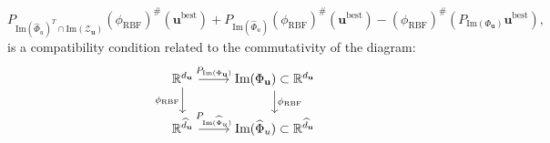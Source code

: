 \begin{rmk}
  \begin{equation*}
    P_{\text{Im}(\widehat{\Phi}_{u})^T\cap\text{Im}(\mathcal{Z}_{\mathbf u})}(\phi_{\text{RBF}})^{\#}({\mathbf u}^{\text{best}})+P_{\text{Im}(\widehat{\Phi}_{u})}(\phi_{\text{RBF}})^{\#}({\mathbf u}^{\text{best}})-(\phi_{\text{RBF}})^{\#}(P_{\text{Im}(\Phi_{\mathbf u})}{\mathbf u}^{\text{best}}),
  \end{equation*}
  is a compatibility condition related to the commutativity of the diagram:
  \[ \begin{tikzcd}
    \mathbb{R}^{d_{\mathbf u}} \arrow{r}{P_{\text{Im}(\Phi_{\mathbf u})}} \arrow[swap]{d}{\phi_{\text{RBF}}} & \text{Im}(\Phi_{\mathbf u})\subset\mathbb{R}^{d_{\mathbf u}} \arrow{d}{\phi_{\text{RBF}}} \\%
    \mathbb{R}^{\widehat{d}_{\mathbf u}} \arrow{r}{P_{\text{Im}(\widehat{\Phi}_{u})}}& \text{Im}(\widehat{\Phi}_{u})\subset\mathbb{R}^{\widehat{d}_{\mathbf u}}
  \end{tikzcd}
  \]
\end{rmk}

